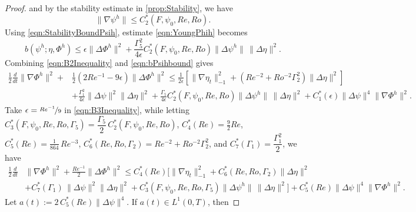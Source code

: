 \begin{proof}
  and by the stability estimate in \autoref{prop:Stability}, we have
  \begin{equation}
    \|\nabla \psi^h\| \le C^*_2(F,\psi_0, Re, Ro).
    \label{eqn:StabilityBoundPsih}
  \end{equation}
  Using \eqref{eqn:StabilityBoundPsih}, estimate \eqref{eqn:YoungPhih} becomes
  \begin{equation}
    b(\psi^h; \eta, \Phi^h) \le \epsilon \|\Delta \Phi^h\|^2 +
      \frac{\Gamma_5^2}{4\epsilon} C^*_2(F,\psi_0,Re,Ro) \|\Delta \psi^h\|\,
      \|\Delta \eta\|^2.
    \label{eqn:bPsihbound}
  \end{equation}
  Combining \eqref{eqn:B2Inequality} and \eqref{eqn:bPsihbound} gives
  \begin{equation}
    \begin{split}
      \frac{1}{2} \frac{d}{dt} \|\nabla \Phi^h\|^2 + &\frac{1}{2}\left(2Re^{-1} -
        9 \epsilon \right)
        \|\Delta \Phi^h\|^2 \le \frac{1}{2 \epsilon}\left[\|\nabla \eta_t\|_{-1}^2
        + \left( Re^{-2} + Ro^{-2} \Gamma_2^2 \right) \|\Delta \eta\|^2\right] \\
      & + \frac{\Gamma_1^2}{4 \epsilon} \|\Delta \psi\|^2 \|\Delta \eta\|^2
        + \frac{\Gamma_5}{4\epsilon}C^*_2(F,\psi_0,Re,Ro) \|\Delta \psi^h\|\,
        \|\Delta \eta\|^2 + C^*_1(\epsilon) \|\Delta \psi\|^4 \|\nabla \Phi^h\|^2.
    \end{split}
    \label{eqn:B3Inequality}
  \end{equation}
  Take $\epsilon = \nicefrac{Re^{-1}}{9}$ in \eqref{eqn:B3Inequality}, while
  letting $C^*_3(F,\psi_0,Re,Ro,\Gamma_5) = \dfrac{\Gamma_5}{2}\, C^*_2(F,\psi_0,Re,Ro)$,
  $C^*_4(Re) = \frac{9}{2} Re$, $C^*_5(Re)=\frac{1}{864}\,Re^{-3}$,
  $C^*_6(Re,Ro,\Gamma_2) = Re^{-2} + Ro^{-2}\Gamma_2^2$, and $C^*_7(\Gamma_1) = \dfrac{\Gamma_1^2}{2}$,
  we have
  \begin{equation}
    \begin{split}
      \frac{1}{2} \frac{d}{dt} &\|\nabla \Phi^h\|^2
        + \frac{Re^{-1}}{2} \|\Delta \Phi^h\|^2
        \le C^*_4(Re) \biggl[\|\nabla \eta_t\|_{-1}^2
        + C^*_6(Re, Ro,\Gamma_2) \|\Delta \eta\|^2 \\
      & + C^*_7(\Gamma_1)\, \|\Delta \psi\|^2 \|\Delta \eta\|^2
        + C^*_3(F,\psi_0,Re,Ro,\Gamma_5) \|\Delta \psi^h\|\,
        \|\Delta \eta\|^2\biggr] + C^*_5(Re) \|\Delta \psi\|^4 \|\nabla \Phi^h\|^2.
    \end{split}
    \label{eqn:NoEps}
  \end{equation}
  Let $a(t):= 2\,C^*_5(Re) \|\Delta \psi\|^4$. If $a(t) \in L^1(0,T)$, then

\end{proof}
